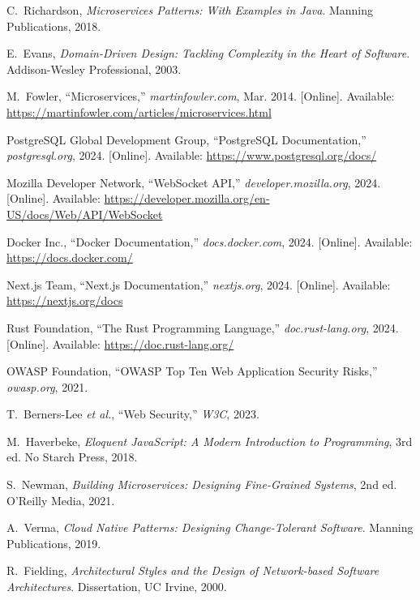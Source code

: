 \documentclass[12pt]{rapportPfe}
\begin{document}
\newpage


\begin{thebibliography}{21}

C.~Richardson, \textit{Microservices Patterns: With Examples in Java}. Manning Publications, 2018.

E.~Evans, \textit{Domain-Driven Design: Tackling Complexity in the Heart of Software}. Addison-Wesley Professional, 2003.

M.~Fowler, ``Microservices,'' \textit{martinfowler.com}, Mar. 2014. [Online]. Available: \url{https://martinfowler.com/articles/microservices.html}

PostgreSQL Global Development Group, ``PostgreSQL Documentation,'' \textit{postgresql.org}, 2024. [Online]. Available: \url{https://www.postgresql.org/docs/}

Mozilla Developer Network, ``WebSocket API,'' \textit{developer.mozilla.org}, 2024. [Online]. Available: \url{https://developer.mozilla.org/en-US/docs/Web/API/WebSocket}

Docker Inc., ``Docker Documentation,'' \textit{docs.docker.com}, 2024. [Online]. Available: \url{https://docs.docker.com/}

Next.js Team, ``Next.js Documentation,'' \textit{nextjs.org}, 2024. [Online]. Available: \url{https://nextjs.org/docs}

Rust Foundation, ``The Rust Programming Language,'' \textit{doc.rust-lang.org}, 2024. [Online]. Available: \url{https://doc.rust-lang.org/}

OWASP Foundation, ``OWASP Top Ten Web Application Security Risks,'' \textit{owasp.org}, 2021.

T.~Berners-Lee \textit{et al.}, ``Web Security,'' \textit{W3C}, 2023.

M.~Haverbeke, \textit{Eloquent JavaScript: A Modern Introduction to Programming}, 3rd ed. No Starch Press, 2018.

S.~Newman, \textit{Building Microservices: Designing Fine-Grained Systems}, 2nd ed. O'Reilly Media, 2021.

A.~Verma, \textit{Cloud Native Patterns: Designing Change-Tolerant Software}. Manning Publications, 2019.

R.~Fielding, \textit{Architectural Styles and the Design of Network-based Software Architectures}. Dissertation, UC Irvine, 2000.


\end{thebibliography}
\end{document}
